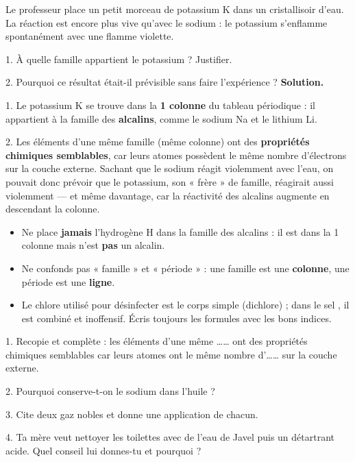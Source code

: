 \documentclass[11pt]{article}
\begin{document}
\begin{exoresolu}
Le professeur place un petit morceau de potassium K dans un cristallisoir d'eau. La réaction est encore plus vive qu'avec le sodium : le potassium s'enflamme spontanément avec une flamme violette.\par
1. À quelle famille appartient le potassium ? Justifier.\par
2. Pourquoi ce résultat était-il prévisible sans faire l'expérience ?
\tcblower
\textbf{Solution.}\par
1. Le potassium K se trouve dans la \textbf{1\iere{} colonne} du tableau périodique : il appartient à la famille des \textbf{alcalins}, comme le sodium Na et le lithium Li.\par
2. Les éléments d'une même famille (même colonne) ont des \textbf{propriétés chimiques semblables}, car leurs atomes possèdent le même nombre d'électrons sur la couche externe. Sachant que le sodium réagit violemment avec l'eau, on pouvait donc prévoir que le potassium, son « frère » de famille, réagirait aussi violemment — et même davantage, car la réactivité des alcalins augmente en descendant la colonne.
\end{exoresolu}

\begin{attention}
\begin{itemize}
\item Ne place \textbf{jamais} l'hydrogène H dans la famille des alcalins : il est dans la 1\iere{} colonne mais n'est \textbf{pas} un alcalin.
\item Ne confonds pas « famille » et « période » : une famille est une \textbf{colonne}, une période est une \textbf{ligne}.
\item Le chlore utilisé pour désinfecter est le corps simple  (dichlore) ; dans le sel , il est combiné et inoffensif. Écris toujours les formules avec les bons indices.
\end{itemize}
\end{attention}

\begin{exercice}
1. Recopie et complète : les éléments d'une même \ldots\ldots{} ont des propriétés chimiques semblables car leurs atomes ont le même nombre d'\ldots\ldots{} sur la couche externe.\par
2. Pourquoi conserve-t-on le sodium dans l'huile ?\par
3. Cite deux gaz nobles et donne une application de chacun.\par
4. Ta mère veut nettoyer les toilettes avec de l'eau de Javel puis un détartrant acide. Quel conseil lui donnes-tu et pourquoi ?
\end{exercice}
\end{document}

